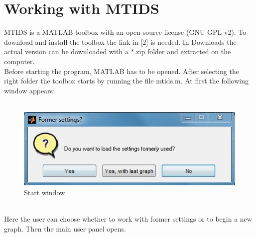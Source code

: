 \documentclass[12pt]{report}
\begin{document}
\chapter{Working with MTIDS}
MTIDS is a MATLAB toolbox with an open-source license (GNU GPL v2). To download and install the toolbox the link in [2] is needed. In Downloads the actual version can be downloaded with a *.zip folder and extracted on the computer.\\
Before starting the program, MATLAB has to be opened. After selecting the right folder the toolbox starts by running the file mtids.m. At first the following window appears:\\
\\
\begin{figure}[h]
\centering
\includegraphics[scale=1.0]{startwindow}
\caption{Start window}
\label{FIG:abb5}
\end{figure}
\\
Here the user can choose whether to work with former settings or to begin a new graph. Then the main user panel opens.\\
\\
\end{document}
